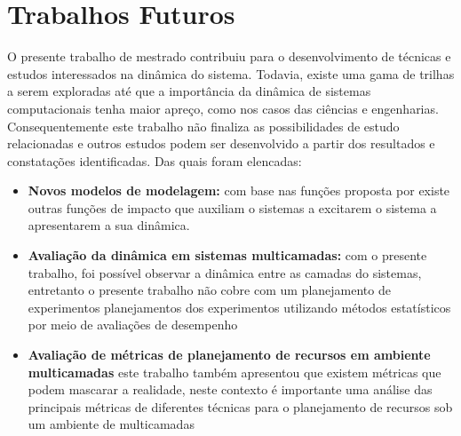 \section{Trabalhos Futuros}
O presente trabalho de mestrado contribuiu para o desenvolvimento de técnicas e estudos interessados na dinâmica do sistema. Todavia, existe uma gama de trilhas a serem exploradas até que a importância da dinâmica de sistemas computacionais tenha maior apreço, como nos casos das ciências e engenharias. Consequentemente este trabalho não finaliza as possibilidades de estudo relacionadas e outros estudos podem ser desenvolvido a partir dos resultados e constatações identificadas. Das quais foram elencadas:
\begin{itemize}
	\item \textbf{Novos modelos de modelagem:} com base nas funções proposta por \cite{Hellerstein2004} existe outras funções de impacto que auxiliam o sistemas a excitarem o sistema a apresentarem a sua dinâmica. 
	\item \textbf{Avaliação da dinâmica em sistemas multicamadas:} com o presente trabalho, foi possível observar a dinâmica entre as camadas do sistemas, entretanto o presente trabalho não cobre com um planejamento de experimentos planejamentos dos experimentos utilizando métodos estatísticos por meio de avaliações de desempenho
	\item \textbf{Avaliação de métricas de planejamento de recursos em ambiente multicamadas} este trabalho também apresentou que existem métricas que podem mascarar a realidade, neste contexto é importante uma análise das principais métricas de diferentes técnicas para o planejamento de recursos sob um ambiente de multicamadas
\end{itemize} 	
